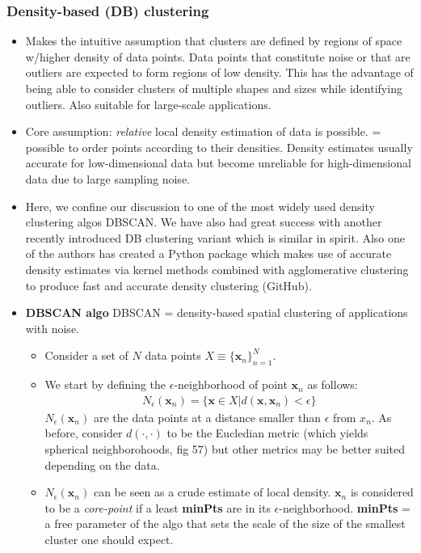 \documentclass[norsk,a4paper,11pt]{article}
\begin{document}
\subsubsection{Density-based (DB) clustering}
\begin{itemize}
	\item Makes the intuitive assumption that clusters are defined by regions of space w/higher density of data points. Data points that constitute noise or that are outliers are expected to form regions of low density. This has the advantage of being able to consider clusters of multiple shapes and sizes while identifying outliers. Also suitable for large-scale applications.
	\item Core assumption: \textit{relative} local density estimation of data is possible. = possible to order points according to their densities. Density estimates usually accurate for low-dimensional data but become unreliable for high-dimensional data due to large sampling noise.
	\item Here, we confine our discussion to one of the most widely used density clustering algos DBSCAN. We have also had great success with another recently introduced DB clustering variant which is similar in spirit. Also one of the authors has created a Python package which makes use of accurate density estimates via kernel methods combined with agglomerative clustering to produce fast and accurate density clustering (GitHub).
	\item \textbf{DBSCAN algo} DBSCAN = density-based spatial clustering of applications with noise.
	\begin{itemize}
		\item Consider a set of $N$ data points $X \equiv \{ \bm{x}_n \}_{n=1}^N$.
		\item We start by defining the $\epsilon$-neighborhood of point $\bm{x}_n$ as follows:
		\begin{align}
			N_\epsilon (\bm{x}_n) = \{ \bm{x} \in X | d(\bm{x}, \bm{x}_n) < \epsilon \}
		\end{align}
		$N_\epsilon (\bm{x}_n)$ are the data points at a distance smaller than $\epsilon$ from $x_n$. As before, consider $d(\cdot, \cdot)$ to be the Eucledian metric (which yields spherical neighborohoods, fig 57) but other metrics may be better suited depending on the data. 
		\item $N_\epsilon (\bm{x}_n)$ can be seen as a crude estimate of local density. $\bm{x}_n$ is considered to be a \textit{core-point} if a least \textbf{minPts} are in its $\epsilon$-neighborhood. \textbf{minPts} = a free parameter of the algo that sets the scale of the size of the smallest cluster one should expect. 

\end{itemize}
\end{itemize}
\end{document}
